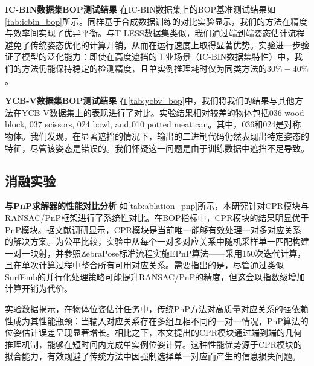 

\textbf{IC-BIN数据集BOP测试结果 } 在IC-BIN数据集上的BOP基准测试结果如\autoref{tab:icbin_bop}所示。同样基于合成数据训练的对比实验显示，我们的方法在精度与效率间实现了优异平衡。与T-LESS数据集类似，我们通过端到端姿态估计流程避免了传统姿态优化的计算开销，从而在运行速度上取得显著优势。实验进一步验证了模型的泛化能力：即使在高度遮挡的工业场景（IC-BIN数据集特性）中，我们的方法仍能保持稳定的检测精度，且单实例推理耗时仅为同类方法的$30\%-40\%$。



\textbf{YCB-V数据集BOP测试结果 } 在\autoref{tab:ycbv_bop}中，我们将我们的结果与其他方法在YCB-V数据集上的表现进行了对比。实验结果相对较差的物体包括036 wood block, 037 scissors, 024 bowl, and 010 potted meat can。其中，036和024是对称物体。我们发现，在显著遮挡的情况下，输出的二进制代码仍然表现出特定姿态的特征，尽管该姿态是错误的。我们怀疑这一问题是由于训练数据中遮挡不足导致。



\subsection{消融实验}

\textbf{与PnP求解器的性能对比分析 } 如\autoref{tab:ablation_pnp}所示，本研究针对CPR模块与RANSAC/PnP框架进行了系统性对比。在BOP指标中，CPR模块的结果明显优于PnP模块。据文献调研显示，CPR模块是当前唯一能够有效处理一对多对应关系的解决方案。为公平比较，实验中从每个一对多对应关系中随机采样单一匹配构建一对一映射，并参照ZebraPose标准流程实施EPnP算法\cite{EPnP}——采用150次迭代计算，且在单次计算过程中整合所有可用对应关系。需要指出的是，尽管通过类似SurfEmb的并行化处理策略可能提升RANSAC/PnP的精度，但这会以指数级增加计算开销为代价。

\par 实验数据揭示，在物体位姿估计任务中，传统PnP方法对高质量对应关系的强依赖性成为其性能瓶颈：当输入对应关系存在多组互相不同的一对一情况，PnP算法的位姿估计误差呈现显著增长。相比之下，本文提出的CPR模块通过端到端的几何推理机制，能够在短时间内完成单实例位姿计算。这种性能优势源于CPR模块的拟合能力，有效规避了传统方法中因强制选择单一对应而产生的信息损失问题。




